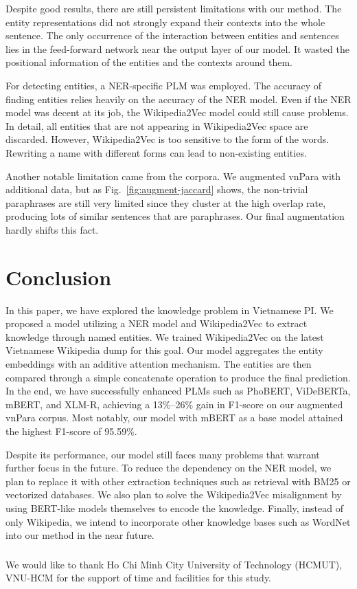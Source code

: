 \documentclass{llncs}
\begin{document}
%
%
Despite good results, there are still persistent limitations with our method. The entity representations did not strongly expand their contexts into the whole sentence. The only occurrence of the interaction between entities and sentences lies in the feed-forward network near the output layer of our model. It wasted the positional information of the entities and the contexts around them.

For detecting entities, a NER-specific PLM was employed. The accuracy of finding entities relies heavily on the accuracy of the NER model. Even if the NER model was decent at its job, the Wikipedia2Vec model could still cause problems. In detail, all entities that are not appearing in Wikipedia2Vec space are discarded. However, Wikipedia2Vec is too sensitive to the form of the words. Rewriting a name with different forms can lead to non-existing entities.

Another notable limitation came from the corpora. We augmented vnPara with additional data, but as Fig.~\ref{fig:augment-jaccard} shows, the non-trivial paraphrases are still very limited since they cluster at the high overlap rate, producing lots of similar sentences that are paraphrases. Our final augmentation hardly shifts this fact.


\section{Conclusion}
\label{sec:conclusion}

In this paper, we have explored the knowledge problem in Vietnamese PI. We proposed a model utilizing a NER model and Wikipedia2Vec to extract knowledge through named entities. We trained Wikipedia2Vec on the latest Vietnamese Wikipedia dump for this goal. Our model aggregates the entity embeddings with an additive attention mechanism. The entities are then compared through a simple concatenate operation to produce the final prediction. In the end, we have successfully enhanced PLMs such as PhoBERT, ViDeBERTa, mBERT, and XLM-R, achieving a 13\%--26\% gain in F1-score on our augmented vnPara corpus. Most notably, our model with mBERT as a base model attained the highest F1-score of 95.59\%.

Despite its performance, our model still faces many problems that warrant further focus in the future. To reduce the dependency on the NER model, we plan to replace it with other extraction techniques such as retrieval with BM25 or vectorized databases. We also plan to solve the Wikipedia2Vec misalignment by using BERT-like models themselves to encode the knowledge. Finally, instead of only Wikipedia, we intend to incorporate other knowledge bases such as WordNet into our method in the near future.

\begin{credits}
\subsubsection{\ackname} We would like to thank Ho Chi Minh City University of Technology (HCMUT), VNU-HCM for the support of time and facilities for this study.
\end{credits}

\printbibliography
\end{document}
